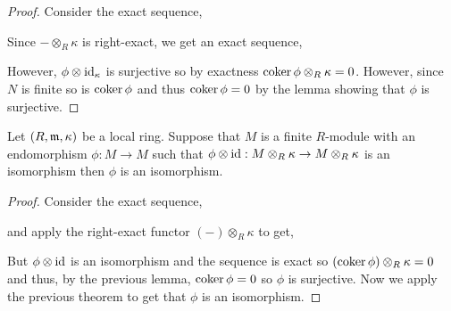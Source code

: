 \documentclass[12pt]{article}
\begin{document}
\begin{proof}
Consider the exact sequence,
\begin{center}
\end{center}
Since $- \otimes_R \kappa$ is right-exact, we get an exact sequence,
\begin{center}
\end{center}
However, $\phi \otimes \mathrm{id}_\kappa$ is surjective so by exactness $\operatorname{\mathrm{coker}}{\phi} \otimes_R \kappa = 0$. However, since $N$ is finite so is $\operatorname{\mathrm{coker}}{\phi}$ and thus $\operatorname{\mathrm{coker}}{\phi} = 0$ by the lemma showing that $\phi$ is surjective.
\end{proof}

\begin{lemma}
Let $(R, \mathfrak{m}, \kappa)$ be a local ring. Suppose that $M$ is a finite $R$-module with an endomorphism $\phi : M \to M$ such that $\phi \otimes \mathrm{id} : M \otimes_R \kappa \to M \otimes_R \kappa$ is an isomorphism then $\phi$ is an isomorphism. 
\end{lemma}

\begin{proof}
Consider the exact sequence,
\begin{center}
\end{center}
and apply the right-exact functor $(-) \otimes_R \kappa$ to get,
\begin{center}
\end{center}
But $\phi \otimes \mathrm{id}$ is an isomorphism and the sequence is exact so $(\operatorname{\mathrm{coker}}{\phi}) \otimes_R \kappa = 0$ and thus, by the previous lemma, $\operatorname{\mathrm{coker}}{\phi} = 0$ so $\phi$ is surjective. Now we apply the previous theorem to get that $\phi$ is an isomorphism.
\end{proof}
\end{document}
